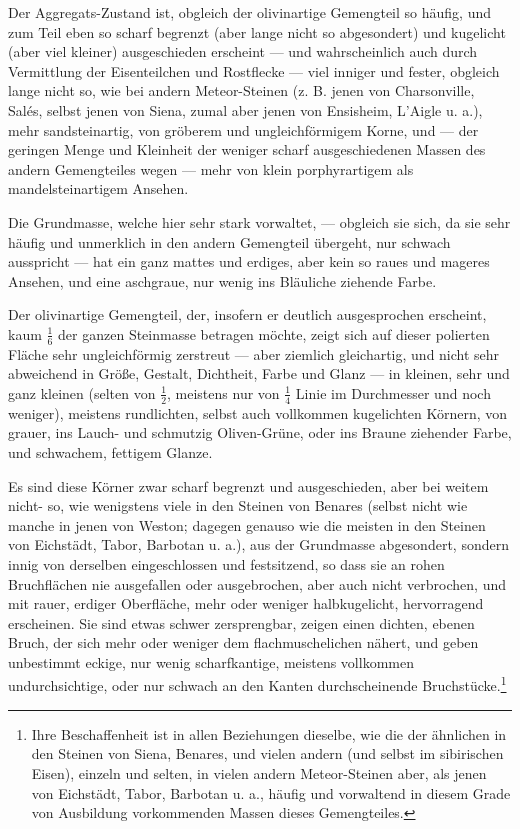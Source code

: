 \documentclass[a4paper, 11pt, oneside, german]{article}
\begin{document}
Der Aggregats-Zustand ist, obgleich der olivinartige Gemengteil so häufig, und zum Teil eben so scharf begrenzt (aber lange nicht so abgesondert) und kugelicht (aber viel kleiner) ausgeschieden erscheint --- und wahrscheinlich auch durch Vermittlung der Eisenteilchen und Rostflecke --- viel inniger und fester, obgleich lange nicht so, wie bei andern Meteor-Steinen (z. B. jenen von Charsonville, Salés, selbst jenen von Siena, zumal aber jenen von Ensisheim, L'Aigle u. a.), mehr sandsteinartig, von gröberem und ungleichförmigem Korne, und --- der geringen Menge und Kleinheit der weniger scharf ausgeschiedenen Massen des andern Gemengteiles wegen --- mehr von klein porphyrartigem als mandelsteinartigem Ansehen.

Die Grundmasse, welche hier sehr stark vorwaltet, --- obgleich sie sich, da sie sehr häufig und unmerklich in den andern Gemengteil übergeht, nur schwach ausspricht --- hat ein ganz mattes und erdiges, aber kein so raues und mageres Ansehen, und eine aschgraue, nur wenig ins Bläuliche ziehende Farbe.

Der olivinartige Gemengteil, der, insofern er deutlich ausgesprochen erscheint, kaum $\frac{1}{6}$ der ganzen Steinmasse betragen möchte, zeigt sich auf dieser polierten Fläche sehr ungleichförmig zerstreut --- aber ziemlich gleichartig, und nicht sehr abweichend in Größe, Gestalt, Dichtheit, Farbe und Glanz --- in kleinen, sehr und ganz kleinen (selten von $\frac{1}{2}$, meistens nur von $\frac{1}{4}$ Linie im Durchmesser und noch weniger), meistens rundlichten, selbst auch vollkommen kugelichten Körnern, von grauer, ins Lauch- und schmutzig Oliven-Grüne, oder ins Braune ziehender Farbe, und schwachem, fettigem Glanze.

Es sind diese Körner zwar scharf begrenzt und ausgeschieden, aber bei weitem nicht- so, wie wenigstens viele in den Steinen von Benares (selbst nicht wie manche in jenen von Weston; dagegen genauso wie die meisten in den Steinen von Eichstädt, Tabor, Barbotan u. a.), aus der Grundmasse abgesondert, sondern innig von derselben eingeschlossen und festsitzend, so dass sie an rohen Bruchflächen nie ausgefallen oder ausgebrochen, aber auch nicht verbrochen, und mit rauer, erdiger Oberfläche, mehr oder weniger halbkugelicht, hervorragend erscheinen. Sie sind etwas schwer zersprengbar, zeigen einen dichten, ebenen Bruch, der sich mehr oder weniger dem flachmuschelichen nähert, und geben unbestimmt eckige, nur wenig scharfkantige, meistens vollkommen undurchsichtige, oder nur schwach an den Kanten durchscheinende Bruchstücke.\footnote{Ihre Beschaffenheit ist in allen Beziehungen dieselbe, wie die der ähnlichen in den Steinen von Siena, Benares, und vielen andern (und selbst im sibirischen Eisen), einzeln und selten, in vielen andern Meteor-Steinen aber, als jenen von Eichstädt, Tabor, Barbotan u. a., häufig und vorwaltend in diesem Grade von Ausbildung vorkommenden Massen dieses Gemengteiles.}
\end{document}
